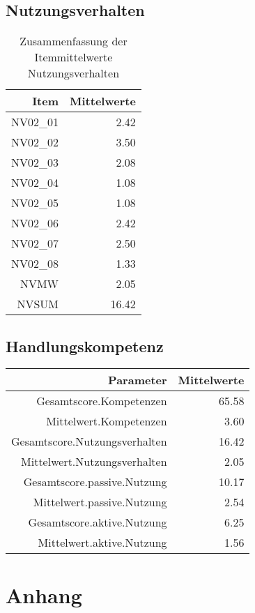 \documentclass[12pt, bibliography=totoc]{scrartcl}
\begin{document}
\subsection{Nutzungsverhalten}\label{nutzungsverhalten}

\begin{table}[H]
\centering
\caption{Zusammenfassung der Itemmittelwerte Nutzungsverhalten}
\begin{tabular}{rr}
  \hline
 Item & Mittelwerte\\
  \hline
NV02\_01 & 2.42 \\
  NV02\_02 & 3.50 \\
  NV02\_03 & 2.08 \\
  NV02\_04 & 1.08 \\
  NV02\_05 & 1.08 \\
  NV02\_06 & 2.42 \\
  NV02\_07 & 2.50 \\
  NV02\_08 & 1.33 \\
  NVMW & 2.05 \\
  NVSUM & 16.42 \\
   \hline
   \end{tabular}
   \end{table}

\subsection{Handlungskompetenz}\label{handlungskompetenz}

\begin{table}[H]
\centering
\begin{tabular}{rr}
  \hline
 Parameter & Mittelwerte\\
  \hline
Gesamtscore.Kompetenzen & 65.58 \\
  Mittelwert.Kompetenzen & 3.60 \\
  Gesamtscore.Nutzungsverhalten & 16.42 \\
  Mittelwert.Nutzungsverhalten & 2.05 \\
  Gesamtscore.passive.Nutzung & 10.17 \\
  Mittelwert.passive.Nutzung & 2.54 \\
  Gesamtscore.aktive.Nutzung & 6.25 \\
  Mittelwert.aktive.Nutzung & 1.56 \\
   \hline
\end{tabular}
\end{table}

\pagebreak

\pagebreak
\printbibliography
\pagebreak
\appendix


  \section{Anhang}
  


%
%
\end{document}
